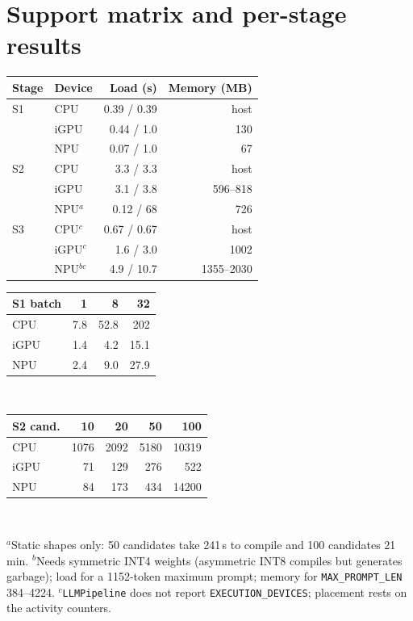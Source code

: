 \documentclass[10pt]{article}
\begin{document}
\section{Support matrix and per-stage results}
\begin{table}[!htb]\centering\small
\begin{minipage}[t]{0.5\linewidth}\centering
{}\label{tab:support}
\begin{tabular}{llrr}\toprule
Stage & Device & Load (s) & Memory (MB)\\\midrule
S1 & CPU & 0.39 / 0.39 & host\\
 & iGPU & 0.44 / 1.0 & 130\\
 & NPU & 0.07 / 1.0 & 67\\
S2 & CPU & 3.3 / 3.3 & host\\
 & iGPU & 3.1 / 3.8 & 596--818\\
 & NPU$^a$ & 0.12 / 68 & 726\\
S3 & CPU$^c$ & 0.67 / 0.67 & host\\
 & iGPU$^c$ & 1.6 / 3.0 & 1002\\
 & NPU$^{bc}$ & 4.9 / 10.7 & 1355--2030\\\bottomrule
\end{tabular}
\end{minipage}\hfill
\begin{minipage}[t]{0.47\linewidth}\centering
{}\label{tab:s12}
\begin{tabular}{lrrr}\toprule
S1 batch & 1 & 8 & 32\\\midrule
CPU & 7.8 & 52.8 & 202\\
iGPU & 1.4 & 4.2 & 15.1\\
NPU & 2.4 & 9.0 & 27.9\\\bottomrule
\end{tabular}\\[6pt]
\begin{tabular}{lrrrr}\toprule
S2 cand. & 10 & 20 & 50 & 100\\\midrule
CPU & 1076 & 2092 & 5180 & 10319\\
iGPU & 71 & 129 & 276 & 522\\
NPU & 84 & 173 & 434 & 14200\\\bottomrule
\end{tabular}
\end{minipage}\\[3pt]
\raggedright\footnotesize
$^a$Static shapes only: 50 candidates take 241\,s to compile and 100 candidates 21\,min. $^b$Needs symmetric INT4 weights (asymmetric INT8 compiles but generates garbage); load for a 1152-token maximum prompt; memory for \texttt{MAX\_PROMPT\_LEN} 384--4224. $^c$\texttt{LLMPipeline} does not report \texttt{EXECUTION\_DEVICES}; placement rests on the activity counters.
\end{table}
\end{document}
